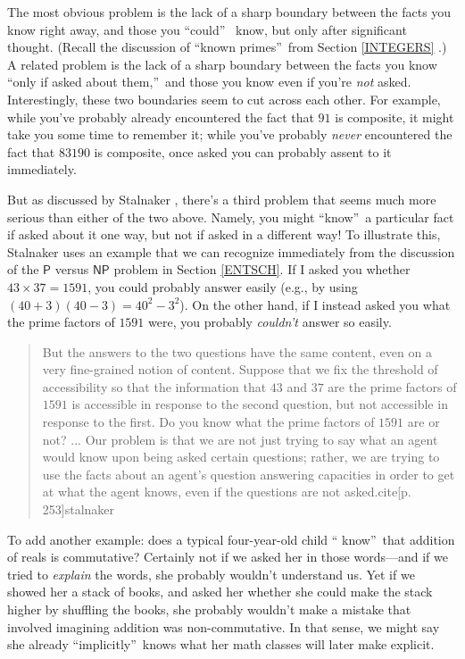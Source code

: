 \documentclass[12pt,onecolumn]{article}%
\begin{document}
The most obvious problem is the lack of a sharp boundary between the facts you
know right away, and those you \textquotedblleft could\textquotedblright\ %
 know, but only after significant thought. (Recall the discussion of
\textquotedblleft known primes\textquotedblright\  from Section \ref{INTEGERS}%
.) A related problem is the lack of a sharp boundary between the facts you
know \textquotedblleft only if asked about them,\textquotedblright\  and those
you know even if you're \textit{not} asked. Interestingly, these two
boundaries seem to cut across each other. For example, while you've probably
already encountered the fact that $91$ is composite, it might take you some
time to remember it; while you've probably \textit{never} encountered the fact
that $83190$ is composite, once asked you can probably assent to it immediately.

But as discussed by Stalnaker \cite{stalnaker}, there's a third problem that
seems much more serious than either of the two above. Namely, you might
\textquotedblleft know\textquotedblright\  a particular fact if asked about it
one way, but not if asked in a different way! To illustrate this, Stalnaker
uses an example that we can recognize immediately from the discussion of the
$\mathsf{P}$ versus $\mathsf{NP}$ problem in Section \ref{ENTSCH}. If I
asked you whether $43\times37=1591$, you could probably answer easily (e.g.,
by using $\left(  40+3\right)  \left(  40-3\right)  =40^{2}-3^{2}$). On the
other hand, if I instead asked you what the prime factors of $1591$ were, you
probably \textit{couldn't} answer so easily.

\begin{quotation}
\noindent But the answers to the two questions have the same content, even on
a very fine-grained notion of content. Suppose that we fix the threshold of
accessibility so that the information that $43$ and $37$ are the prime factors
of $1591$ is accessible in response to the second question, but not accessible
in response to the first. Do you know what the prime factors of $1591$ are
or not? ... Our problem is that we are not just trying to say what an agent
would know upon being asked certain questions; rather, we are trying to use
the facts about an agent's question answering capacities in order to get at
what the agent knows, even if the questions are not asked.cite[p.
253]{stalnaker}
\end{quotation}

To add another example: does a typical four-year-old child \textquotedblleft
know\textquotedblright\  that addition of reals is commutative? Certainly not
if we asked her in those words---and if we tried to \textit{explain} the
words, she probably wouldn't understand us. Yet if we showed her a stack of
books, and asked her whether she could make the stack higher by shuffling the
books, she probably wouldn't make a mistake that involved imagining addition
was non-commutative. In that sense, we might say she already
\textquotedblleft implicitly\textquotedblright\  knows what her math classes
will later make explicit.
\end{document}
